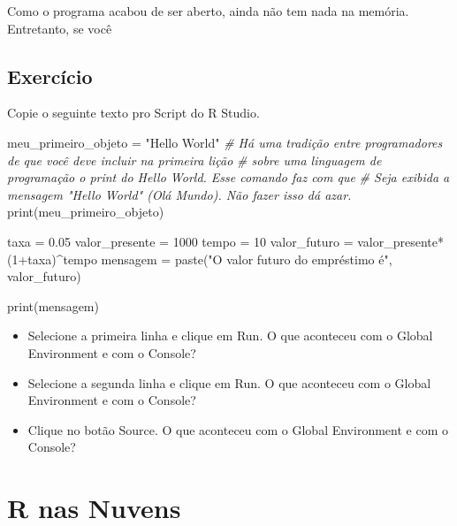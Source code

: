 \documentclass[
]{book}
\newenvironment{Shaded}{\begin{snugshade}}{\end{snugshade}}
\newcommand{\CommentTok}[1]{\textcolor[rgb]{0.56,0.35,0.01}{\textit{#1}}}
\newcommand{\DecValTok}[1]{\textcolor[rgb]{0.00,0.00,0.81}{#1}}
\newcommand{\FloatTok}[1]{\textcolor[rgb]{0.00,0.00,0.81}{#1}}
\newcommand{\FunctionTok}[1]{\textcolor[rgb]{0.00,0.00,0.00}{#1}}
\newcommand{\NormalTok}[1]{#1}
\newcommand{\OtherTok}[1]{\textcolor[rgb]{0.56,0.35,0.01}{#1}}
\newcommand{\SpecialCharTok}[1]{\textcolor[rgb]{0.00,0.00,0.00}{#1}}
\newcommand{\StringTok}[1]{\textcolor[rgb]{0.31,0.60,0.02}{#1}}
\providecommand{\tightlist}{%
  \setlength{\itemsep}{0pt}\setlength{\parskip}{0pt}}
\begin{document}
Como o programa acabou de ser aberto, ainda não tem nada na memória. Entretanto, se você

\hypertarget{exercuxedcio}{%
\subsection{Exercício}\label{exercuxedcio}}

Copie o seguinte texto pro Script do R Studio.

\begin{Shaded}
\begin{Highlighting}[]
\NormalTok{meu\_primeiro\_objeto }\OtherTok{=} \StringTok{"Hello World"}
\CommentTok{\# Há uma tradição entre programadores de que você deve incluir na primeira lição}
\CommentTok{\# sobre uma linguagem de programação o print do Hello World. Esse comando faz com que }
\CommentTok{\# Seja exibida a mensagem "Hello World" (Olá Mundo). Não fazer isso dá azar.}
\FunctionTok{print}\NormalTok{(meu\_primeiro\_objeto)}

\NormalTok{taxa }\OtherTok{=} \FloatTok{0.05}
\NormalTok{valor\_presente }\OtherTok{=} \DecValTok{1000}
\NormalTok{tempo }\OtherTok{=} \DecValTok{10}
\NormalTok{valor\_futuro }\OtherTok{=}\NormalTok{ valor\_presente}\SpecialCharTok{*}\NormalTok{(}\DecValTok{1}\SpecialCharTok{+}\NormalTok{taxa)}\SpecialCharTok{\^{}}\NormalTok{tempo}
\NormalTok{mensagem }\OtherTok{=} \FunctionTok{paste}\NormalTok{(}\StringTok{"O valor futuro do empréstimo é"}\NormalTok{, valor\_futuro)}

\FunctionTok{print}\NormalTok{(mensagem)}
\end{Highlighting}
\end{Shaded}

\begin{itemize}
\tightlist
\item
  Selecione a primeira linha e clique em Run. O que aconteceu com o Global Environment e com o Console?
\item
  Selecione a segunda linha e clique em Run. O que aconteceu com o Global Environment e com o Console?
\item
  Clique no botão Source. O que aconteceu com o Global Environment e com o Console?
\end{itemize}

\hypertarget{r-nas-nuvens}{%
\section{R nas Nuvens}\label{r-nas-nuvens}}
\end{document}
